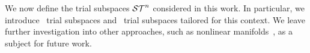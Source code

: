 We now define the trial subspaces $\mathcal{ ST }^{n}$ considered in this work. In
	particular, we introduce \spatialAcronym\ trial subspaces and
	\spaceTimeAcronym\ trial subspaces tailored for this context. 
We leave further investigation into other approaches, such as nonlinear
	manifolds~\cite{leeCarlberg}, as a subject for future work.
